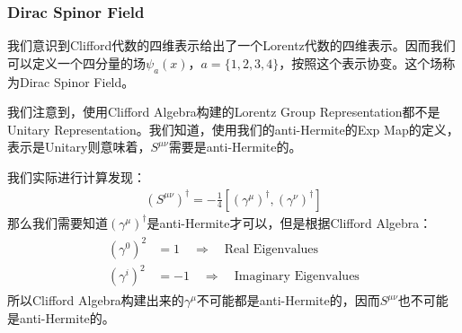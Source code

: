 \subsubsection{Dirac Spinor Field}


我们意识到Clifford代数的四维表示给出了一个Lorentz代数的四维表示。因而我们可以定义一个四分量的场$\psi_a(x)$，$a=\{1,2,3,4\}$，按照这个表示协变。这个场称为Dirac Spinor Field。

\YL{[省略对于boost和rotation具体形式计算]}



我们注意到，使用Clifford Algebra构建的Lorentz Group Representation都不是Unitary Representation。我们知道，使用我们的anti-Hermite的Exp Map的定义，表示是Unitary则意味着，$ S^{\mu \nu} $需要是anti-Hermite的。

我们实际进行计算发现：
\begin{align}
  (S^{\mu\nu})^\dagger=-\frac{1}{4}[(\gamma^\mu)^\dagger,(\gamma^\nu)^\dagger]
\end{align}
那么我们需要知道$ (\gamma^\mu)^\dagger $是anti-Hermite才可以，但是根据Clifford Algebra：
\begin{align}
  \begin{aligned}(\gamma^0)^2&=1\quad\Rightarrow\quad\text{Real Eigenvalues}\\(\gamma^i)^2&=-1\quad\Rightarrow\quad\text{Imaginary Eigenvalues}\end{aligned}
\end{align}
所以Clifford Algebra构建出来的$ \gamma^\mu $不可能都是anti-Hermite的，因而$ S^{\mu \nu} $也不可能是anti-Hermite的。

\bigskip
{}

